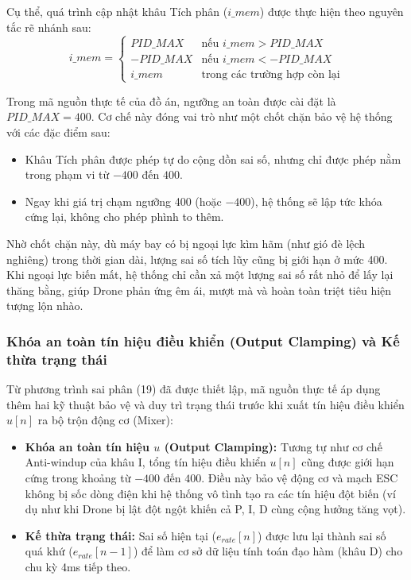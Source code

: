 Cụ thể, quá trình cập nhật khâu Tích phân ($i\_mem$) được thực hiện theo nguyên tắc rẽ nhánh sau:
\begin{equation}
    i\_mem = 
    \begin{cases} 
        PID\_MAX & \text{nếu } i\_mem > PID\_MAX \\
        -PID\_MAX & \text{nếu } i\_mem < -PID\_MAX \\
        i\_mem & \text{trong các trường hợp còn lại}
    \end{cases}
\end{equation}

Trong mã nguồn thực tế của đồ án, ngưỡng an toàn được cài đặt là $PID\_MAX = 400$. Cơ chế này đóng vai trò như một chốt chặn bảo vệ hệ thống với các đặc điểm sau:
\begin{itemize}
    \item Khâu Tích phân được phép tự do cộng dồn sai số, nhưng chỉ được phép nằm trong phạm vi từ $-400$ đến $400$.
    \item Ngay khi giá trị chạm ngưỡng 400 (hoặc $-400$), hệ thống sẽ lập tức khóa cứng lại, không cho phép phình to thêm.
\end{itemize}

Nhờ chốt chặn này, dù máy bay có bị ngoại lực kìm hãm (như gió đè lệch nghiêng) trong thời gian dài, lượng sai số tích lũy cũng bị giới hạn ở mức 400. Khi ngoại lực biến mất, hệ thống chỉ cần xả một lượng sai số rất nhỏ để lấy lại thăng bằng, giúp Drone phản ứng êm ái, mượt mà và hoàn toàn triệt tiêu hiện tượng lộn nhào.

\subsubsection{Khóa an toàn tín hiệu điều khiển (Output Clamping) và Kế thừa trạng thái}

Từ phương trình sai phân (19) đã được thiết lập, mã nguồn thực tế áp dụng thêm hai kỹ thuật bảo vệ và duy trì trạng thái trước khi xuất tín hiệu điều khiển $u[n]$ ra bộ trộn động cơ (Mixer):

\begin{itemize}
    \item \textbf{Khóa an toàn tín hiệu $u$ (Output Clamping):} Tương tự như cơ chế Anti-windup của khâu I, tổng tín hiệu điều khiển $u[n]$ cũng được giới hạn cứng trong khoảng từ $-400$ đến $400$. Điều này bảo vệ động cơ và mạch ESC không bị sốc dòng điện khi hệ thống vô tình tạo ra các tín hiệu đột biến (ví dụ như khi Drone bị lật đột ngột khiến cả P, I, D cùng cộng hưởng tăng vọt).
    \item \textbf{Kế thừa trạng thái:} Sai số hiện tại ($e_{rate}[n]$) được lưu lại thành sai số quá khứ ($e_{rate}[n-1]$) để làm cơ sở dữ liệu tính toán đạo hàm (khâu D) cho chu kỳ 4ms tiếp theo.
\end{itemize}

